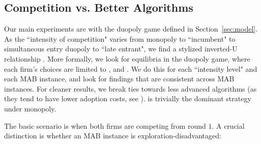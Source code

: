 \documentclass[../competing_bandits_with_appendix.tex]{subfiles}
\begin{document}
\subsection{Competition vs. Better Algorithms}\label{sec:competition}

Our main experiments are with the duopoly game defined in Section~\ref{sec:model}. As the ``intensity of competition" varies from  monopoly to ``incumbent" to simultaneous entry duopoly to ``late entrant", we find a stylized inverted-U relationship . More formally, we look for equilibria in the duopoly game, where each firm's choices are limited to \DynamicGreedy, \DynamicEpsGreedy and \Thompson. We do this for each ``intensity level" and each MAB instance, and look for findings that are consistent across MAB instances. For cleaner results, we break ties towards less advanced algorithms (as they tend to have lower adoption costs, see \cite{DS-arxiv}). \DynamicGreedy is trivially the dominant strategy under monopoly.


The basic scenario is when both firms are competing from round $1$. A crucial distinction is whether an MAB instance is exploration-disadvantaged:

\end{document}
